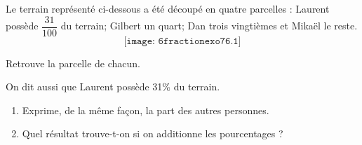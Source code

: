 Le terrain représenté ci-dessous a été découpé en quatre parcelles :
Laurent possède $\dfrac{31}{100}$ du terrain; Gilbert un quart; Dan
trois vingtièmes et Mikaël le reste.
\[\texttt{[image: 6fractionexo76.1]}\]
\begin{myenumerate}
\item Retrouve la parcelle de chacun.
\item On dit aussi que Laurent possède 31\% du terrain.
  \begin{enumerate}
  \item Exprime, de la même façon, la part des autres personnes.
  \item Quel résultat trouve-t-on si on additionne les pourcentages ?
  \end{enumerate}
\end{myenumerate}